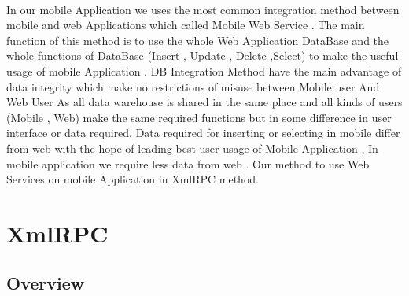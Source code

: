 \documentclass[12pt,a4paper,class,twoside,openany]{report}
\begin{document}
{\paragraph*{\hspace{.9 cm} }In our mobile Application we uses the most common integration method between mobile and web Applications which called Mobile Web Service .
The main function of this method is to use the whole Web Application DataBase and the whole  functions of DataBase (Insert , Update , Delete ,Select) to make the useful usage of mobile Application . DB Integration Method have the main advantage of data integrity which make no restrictions of misuse between Mobile user And Web User As all data warehouse is shared in the same place and all kinds of users (Mobile , Web) make the same required functions but in some difference in user interface or data required.	Data required for inserting or selecting in mobile differ from web  with the hope of leading best user usage of Mobile Application , In mobile application we require less data from web .	Our method to use Web Services on mobile Application in XmlRPC method.

\section{XmlRPC}
\subsection{Overview}
}
\end{document}
